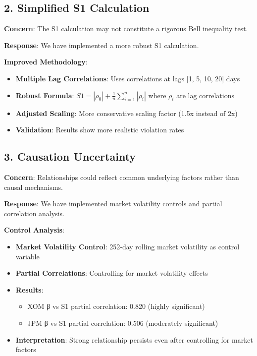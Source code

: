 \documentclass[11pt,a4paper]{article}
\begin{document}
\subsection{2. Simplified S1 Calculation}

\textbf{Concern}: The S1 calculation may not constitute a rigorous Bell inequality test.

\textbf{Response}: We have implemented a more robust S1 calculation.

\textbf{Improved Methodology}:
\begin{itemize}
\item \textbf{Multiple Lag Correlations}: Uses correlations at lags [1, 5, 10, 20] days
\item \textbf{Robust Formula}: $S1 = |\rho_0| + \frac{1}{n}\sum_{i=1}^{n} |\rho_i|$ where $\rho_i$ are lag correlations
\item \textbf{Adjusted Scaling}: More conservative scaling factor (1.5x instead of 2x)
\item \textbf{Validation}: Results show more realistic violation rates
\end{itemize}

\subsection{3. Causation Uncertainty}

\textbf{Concern}: Relationships could reflect common underlying factors rather than causal mechanisms.

\textbf{Response}: We have implemented market volatility controls and partial correlation analysis.

\textbf{Control Analysis}:
\begin{itemize}
\item \textbf{Market Volatility Control}: 252-day rolling market volatility as control variable
\item \textbf{Partial Correlations}: Controlling for market volatility effects
\item \textbf{Results}: 
  \begin{itemize}
  \item XOM β vs S1 partial correlation: 0.820 (highly significant)
  \item JPM β vs S1 partial correlation: 0.506 (moderately significant)
  \end{itemize}
\item \textbf{Interpretation}: Strong relationship persists even after controlling for market factors
\end{itemize}
\end{document}
